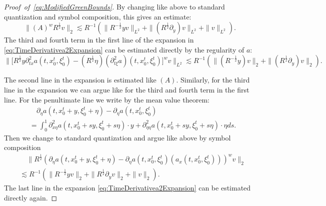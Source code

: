 \documentclass{amsart}
\theoremstyle{definition}
\begin{document}
\begin{proof}[Proof~of~\eqref{eq:ModifiedGreenBounds}]
By changing like above to standard quantization and symbol composition, this gives an estimate:
\begin{equation*}
\| (A)^w R^{\frac{1}{2}} v \|_2 \lesssim R^{-1} ( \| R^{-\frac{1}{2}} y  v \|_{L^2} + \| (R^{\frac{1}{2}} \partial_y ) v \|_{L^2} + \| v \|_{L^2}).
\end{equation*}
The third and fourth term in the first line of the expansion in \eqref{eq:TimeDerivativea2Expansion} can be estimated directly by the regularity of $a$:
\begin{equation*}
 \| \big[ R^{\frac{1}{2}} y \partial^2_{tx} a(t,x_0^t,\xi_0^t) - (R^{\frac{1}{2}} \eta) (\partial^2_{t \xi} a)(t,x_0^t,\xi_0^t) \big]^w v \|_{L^2} \lesssim R^{-1}( \| (R^{-\frac{1}{2}} y) v \|_2 + \| (R^{\frac{1}{2}} \partial_y) v \|_2).
\end{equation*}

The second line in the expansion is estimated like $(A)$. Similarly, for the third line in the expansion we can argue like for the third and fourth term in the first line. For the penultimate line we write by the mean value theorem:
\begin{equation*}
\begin{split}
&\quad \partial_{\eta} a(t,x_0^t+y,\xi_0^t + \eta) - \partial_{\eta} a(t,x_0^t,\xi_0^t) \\
&= \int_0^1 \partial^2_{x \eta} a(t,x_0^t+sy,\xi_0^t + s \eta) \cdot y + \partial^2_{\eta \eta} a(t,x_0^t+sy,\xi_0^t + s \eta) \cdot \eta ds.
\end{split}
\end{equation*}
Then we change to standard quantization and argue like above by symbol composition
\begin{equation*}
\begin{split}
&\quad \| R^{\frac{1}{2}} (\partial_{\eta} a(t,x_0^t + y, \xi_0^t + \eta) - \partial_{\eta} a(t,x_0^t,\xi_0^t) (a_x(t,x_0^t,\xi_0^t)))^w v \|_2 \\
&\lesssim R^{-1} ( \| R^{-\frac{1}{2}} y v \|_2 + \| R^{\frac{1}{2}} \partial_y v \|_2 + \| v \|_2).
\end{split}
\end{equation*} 
The last line in the expansion \eqref{eq:TimeDerivativea2Expansion} can be estimated directly again. 


\end{proof}
\end{document}
